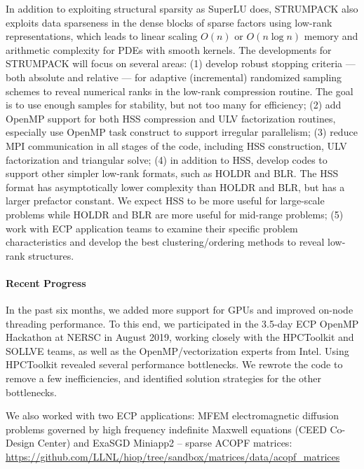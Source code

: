 In addition to exploiting structural sparsity as SuperLU does, STRUMPACK
also exploits data sparseness in the dense blocks of sparse factors using
low-rank representations, which leads to linear scaling $O(n)$ or $O(n \log n)$
memory and arithmetic complexity for PDEs with smooth kernels.
The developments for STRUMPACK will focus on several areas:
(1) develop robust stopping criteria --- both absolute and relative --- for
    adaptive (incremental) randomized sampling schemes to reveal numerical
    ranks in the low-rank compression routine. The goal is to use
    enough samples for stability, but not too many for efficiency;
(2) add OpenMP support for both HSS compression and ULV factorization routines,
    especially use OpenMP task construct to support irregular parallelism;
(3) reduce MPI communication in all stages of the code, including HSS
    construction, ULV factorization and triangular solve;
(4) in addition to HSS, develop codes to support other simpler low-rank
    formats, such as HOLDR and BLR. The HSS format has asymptotically
    lower complexity than HOLDR and BLR, but has a larger prefactor constant.
    We expect HSS to be more useful for large-scale problems while HOLDR
    and BLR are more useful for mid-range problems;
(5) work with ECP application teams to examine their specific problem
    characteristics and develop the best clustering/ordering methods to 
    reveal low-rank structures.

\paragraph{Recent Progress}
In the past six months, we added more support for GPUs and
improved on-node threading performance.  To this end, we participated
in the 3.5-day ECP OpenMP Hackathon at NERSC in August 2019,
working closely with the HPCToolkit and SOLLVE teams,
as well as the OpenMP/vectorization experts from Intel.  
Using HPCToolkit revealed several performance bottlenecks.  We rewrote
the code to remove a few inefficiencies, and identified solution strategies
for the other bottlenecks.

We also worked with two ECP applications: MFEM electromagnetic diffusion
problems governed by high frequency indefinite Maxwell equations
(CEED Co-Design Center) and ExaSGD Miniapp2 -- sparse ACOPF matrices:
\url{https://github.com/LLNL/hiop/tree/sandbox/matrices/data/acopf_matrices}

